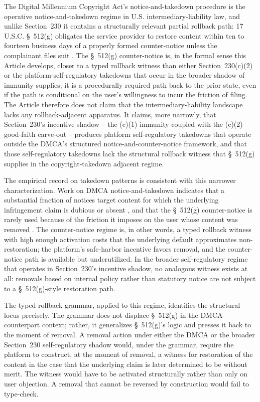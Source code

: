The Digital Millennium Copyright Act's notice-and-takedown procedure
\cite{ref_dmca_512} is the operative notice-and-takedown regime in U.S. intermediary-liability law, and
unlike Section~230 it contains a structurally relevant partial rollback path: 17 U.S.C. \S~512(g)
obligates the service provider to restore content within ten to fourteen business days of a properly
formed counter-notice unless the complainant files suit \cite{ref_dmca_512g}.
The \S~512(g) counter-notice is, in the formal sense this Article develops, closer to a typed rollback
witness than either Section~230(c)(2) or the platform-self-regulatory takedowns that occur in the
broader shadow of immunity supplies; it is a procedurally required path back to the prior state, even if
the path is conditional on the user's willingness to incur the friction of filing.
The Article therefore does not claim that the intermediary-liability landscape lacks any
rollback-adjacent apparatus.
It claims, more narrowly, that Section~230's incentive shadow -- the (c)(1) immunity coupled with the
(c)(2) good-faith carve-out -- produces platform self-regulatory takedowns that operate outside the
DMCA's structured notice-and-counter-notice framework, and that those self-regulatory takedowns lack
the structural rollback witness that \S~512(g) supplies in the copyright-takedown adjacent regime.

The empirical record on takedown patterns is consistent with this narrower characterization.
Work on DMCA notice-and-takedown indicates that a substantial fraction of notices target content for
which the underlying infringement claim is dubious or absent \cite{ref_urban_quilter_dmca}, and that
the \S~512(g) counter-notice is rarely used because of the friction it imposes on the user whose
content was removed \cite{ref_seng_dmca}.
The counter-notice regime is, in other words, a typed rollback witness with high enough activation costs
that the underlying default approximates non-restoration; the platform's safe-harbor incentive favors
removal, and the counter-notice path is available but underutilized.
In the broader self-regulatory regime that operates in Section~230's incentive shadow, no analogous
witness exists at all: removals based on internal policy rather than statutory notice are not subject
to a \S~512(g)-style restoration path.

The typed-rollback grammar, applied to this regime, identifies the structural locus precisely.
The grammar does not displace \S~512(g) in the DMCA-counterpart context; rather, it generalizes
\S~512(g)'s logic and presses it back to the moment of removal.
A removal action under either the DMCA or the broader Section~230 self-regulatory shadow would, under
the grammar, require the platform to construct, at the moment of removal, a witness for restoration of
the content in the case that the underlying claim is later determined to be without merit.
The witness would have to be activated structurally rather than only on user objection.
A removal that cannot be reversed by construction would fail to type-check.

